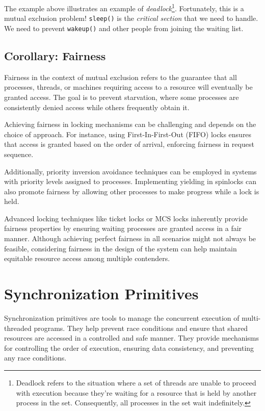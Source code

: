 \documentclass{report}
\begin{document}
The example above illustrates an example of \textit{deadlock}\footnote{Deadlock refers to the
  situation where a set of threads are unable to proceed with execution because they're waiting for
  a resource that is held by another process in the set. Consequently, all processes in the set wait
  indefinitely.}. Fortunately, this is a mutual exclusion problem! \texttt{sleep()} is the
\textit{critical section} that we need to handle. We need to prevent \texttt{wakeup()} and other
people from joining the waiting list.





\section*{Corollary: Fairness}
Fairness in the context of mutual exclusion refers to the guarantee that all processes, threads, or
machines requiring access to a resource will eventually be granted access. The goal is to prevent
starvation, where some processes are consistently denied access while others frequently obtain it.

Achieving fairness in locking mechanisms can be challenging and depends on the choice of
approach. For instance, using First-In-First-Out (FIFO) locks ensures that access is granted based
on the order of arrival, enforcing fairness in request sequence.

Additionally, priority inversion avoidance techniques can be employed in systems with priority
levels assigned to processes. Implementing yielding in spinlocks can also promote fairness by
allowing other processes to make progress while a lock is held.

Advanced locking techniques like ticket locks or MCS locks inherently provide fairness properties by
ensuring waiting processes are granted access in a fair manner. Although achieving perfect fairness
in all scenarios might not always be feasible, considering fairness in the design of the system can
help maintain equitable resource access among multiple contenders. 





\chapter{Synchronization Primitives}
Synchronization primitives are tools to manage the concurrent execution of multi-threaded
programs. They help prevent race conditions and ensure that shared resources are accessed in a
controlled and safe manner. They provide mechanisms for controlling the order of execution, ensuring
data consistency, and preventing any race conditions.
\end{document}
